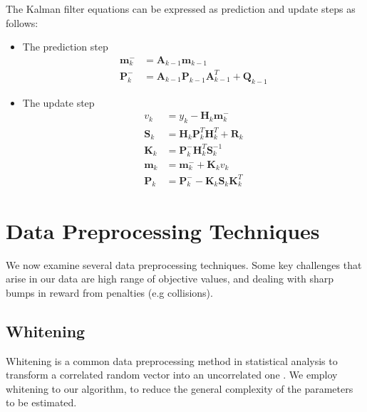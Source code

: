 
The Kalman filter equations can be expressed as
prediction and update steps as follows:
\begin{itemize}
\item The prediction step
  \begin{equation}
    \label{KF_prediction}
    \begin{aligned}
      \mathbf{m}_k^- &= \mathbf{A}_{k-1} \mathbf{m}_{k-1} \\
      \mathbf{P}_k^- &= \mathbf{A}_{k-1} \mathbf{P}_{k-1} \mathbf{A}^T_{k-1}
      + \mathbf{Q}_{k-1}
    \end{aligned}
  \end{equation}

\item The update step
  \begin{equation}
    \label{KF_update}
    \begin{aligned}
      v_k &= y_k - \mathbf{H}_k \mathbf{m}_k^- \\
      \mathbf{S}_k &= \mathbf{H}_k \mathbf{P}_k^T \mathbf{H}^T_k +
      \mathbf{R}_k \\
      \mathbf{K}_k &= \mathbf{P}_k^- \mathbf{H}_k^T \mathbf{S}_k^{-1} \\
      \mathbf{m}_k &= \mathbf{m}_k^- + \mathbf{K}_k v_k \\
      \mathbf{P}_k &= \mathbf{P}_k^- - \mathbf{K}_k \mathbf{S}_k \mathbf{K}_k^T
    \end{aligned}
  \end{equation}
\end{itemize}


\section{Data Preprocessing Techniques}
We now examine several data preprocessing techniques. Some key challenges
that arise in our data  are
high range of objective values,
and dealing with sharp bumps in reward from
penalties (e.g collisions).

\subsection{Whitening}
\label{sec:whitening}
Whitening is a common data preprocessing method in statistical analysis
to transform a correlated random vector into an uncorrelated one
\citep{kessy2018optimal}.
We employ whitening to our algorithm, to reduce the general complexity of the
parameters to be estimated. 

